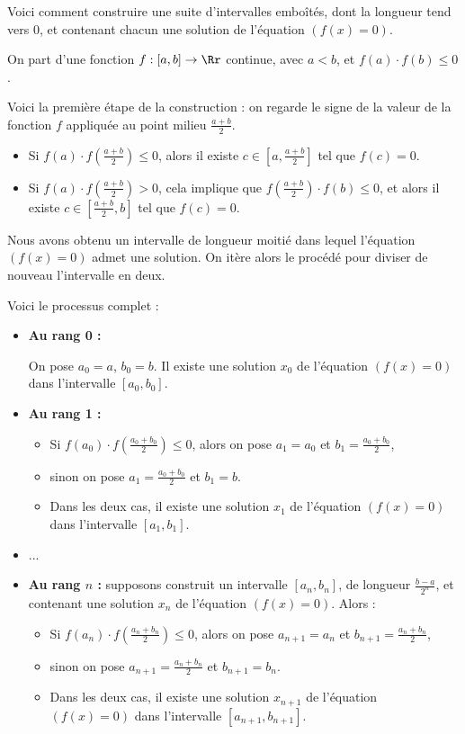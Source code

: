 \documentclass[class=report,crop=false]{standalone}
\begin{document}
Voici comment construire une suite d'intervalles emboîtés, dont la longueur tend vers $0$,
et contenant chacun une solution de l'équation $(f(x)=0)$.

On part d'une fonction $f : [a,b] \to \Rr$ continue, avec $a < b$, et $f(a)\cdot f(b)\le0$.

Voici la première étape de la construction : on regarde le signe
de la valeur de la fonction $f$ appliquée au point milieu $\frac{a+b}{2}$.
\begin{itemize}
  \item Si $f(a)\cdot f(\frac{a+b}{2})\le0$, alors il existe
  $c \in [a,\frac{a+b}{2}]$ tel que $f(c)=0$.
  \item Si $f(a)\cdot f(\frac{a+b}{2})>0$, cela implique que
  $f(\frac{a+b}{2})\cdot f(b)\le0$, et alors il existe $c \in [\frac{a+b}{2},b]$ tel que $f(c)=0$.
\end{itemize}



Nous avons obtenu un intervalle de longueur moitié dans
lequel l'équation $(f(x)=0)$ admet une solution. On itère alors le procédé pour
diviser de nouveau l'intervalle en deux.

Voici le processus complet :
\begin{itemize}
  \item {\bf Au rang 0 :}

  On pose $a_0=a$, $b_0=b$. Il existe une solution $x_0$ de l'équation $(f(x)=0)$ dans l'intervalle $[a_0,b_0]$.
  \item {\bf Au rang 1 :}

  \begin{itemize}
  \item  Si $f(a_0)\cdot f(\frac{a_0+b_0}{2}) \le 0$, alors on pose $a_1=a_0$ et $b_1=\frac{a_0+b_0}{2}$,
    \item sinon on pose $a_1=\frac{a_0+b_0}{2}$ et $b_1=b$.
    \item Dans les deux cas, il existe une solution $x_1$ de l'équation $(f(x)=0)$ dans l'intervalle $[a_1,b_1]$.
  \end{itemize}

  \item ...
  \item {\bf Au rang $n$ :}   supposons construit un intervalle $[a_n,b_n]$, de longueur $\frac{b-a}{2^n}$, et contenant une solution $x_n$ de l'équation $(f(x)=0)$. Alors :

    \begin{itemize}
   \item Si $f(a_n)\cdot f(\frac{a_n+b_n}{2}) \le 0$, alors on
   pose $a_{n+1}=a_n$ et $b_{n+1}=\frac{a_n+b_n}{2}$,
  \item sinon on pose $a_{n+1}=\frac{a_n+b_n}{2}$ et $b_{n+1}=b_n$.
   \item Dans les deux cas, il existe une solution $x_{n+1}$ de l'équation $(f(x)=0)$ dans l'intervalle $[a_{n+1},b_{n+1}]$.
\end{itemize}

\end{itemize}
\end{document}
